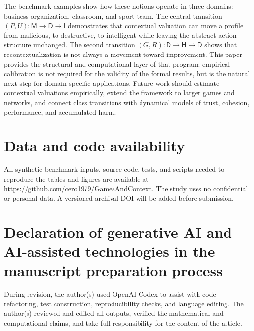 \documentclass[a4paper,fleqn]{cas-dc}
\theoremstyle{remark}
\newcommand{\Iclass}{\mathsf{I}}
\newcommand{\Hclass}{\mathsf{H}}
\newcommand{\Mclass}{\mathsf{M}}
\newcommand{\Dclass}{\mathsf{D}}
\begin{document}
The benchmark examples show how these notions operate in three domains: business organization, classroom, and sport team. The central transition $(P,U):\Mclass\to\Dclass\to\Iclass$ demonstrates that contextual valuation can move a profile from malicious, to destructive, to intelligent while leaving the abstract action structure unchanged. The second transition $(G,R):\Dclass\to\Hclass\to\Dclass$ shows that recontextualization is not always a movement toward improvement. This paper provides the structural and computational layer of that program: empirical calibration is not required for the validity of the formal results, but is the natural next step for domain-specific applications. Future work should estimate contextual valuations empirically, extend the framework to larger games and networks, and connect class transitions with dynamical models of trust, cohesion, performance, and accumulated harm.

\appendix


\section*{Data and code availability}
All synthetic benchmark inputs, source code, tests, and scripts needed to reproduce the tables and figures are available at \url{https://github.com/cero1979/GamesAndContext}. The study uses no confidential or personal data. A versioned archival DOI will be added before submission.

\section*{Declaration of generative AI and AI-assisted technologies in the manuscript preparation process}
During revision, the author(s) used OpenAI Codex to assist with code refactoring, test construction, reproducibility checks, and language editing. The author(s) reviewed and edited all outputs, verified the mathematical and computational claims, and take full responsibility for the content of the article.
\end{document}
